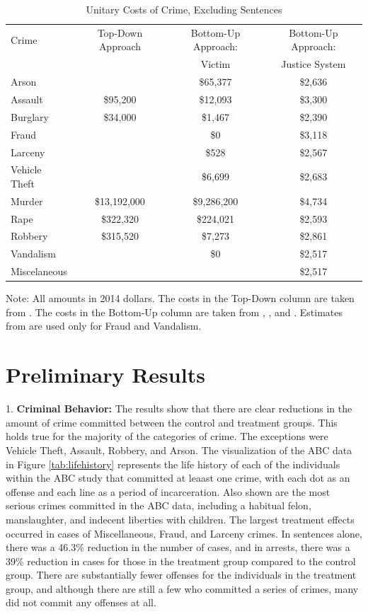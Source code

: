 \documentclass[11pt]{amsart}
\begin{document}
\begin{table}[H] \caption{Unitary Costs of Crime, Excluding Sentences} \label{tab:individual-crime-cost}
\begin{tabular}{lccc}
Crime			&Top-Down Approach	&Bottom-Up Approach:&Bottom-Up Approach:\\ 
				&					&Victim				&Justice System \\ \hline \hline
Arson			&					&\$65,377			&\$2,636\\
Assault			&\$95,200			&\$12,093 			&\$3,300\\
Burglary		&\$34,000			&\$1,467 			&\$2,390\\		
Fraud			&					&\$0				&\$3,118\\
Larceny			&					&\$528 				&\$2,567\\
Vehicle Theft	&					&\$6,699 			&\$2,683\\
Murder			&\$13,192,000		&\$9,286,200 		&\$4,734\\
Rape			&\$322,320			&\$224,021 			&\$2,593\\
Robbery			&\$315,520			&\$7,273 			&\$2,861\\
Vandalism		&					&\$0				&\$2,517\\
Miscelaneous	&					&					&\$2,517\\
\end{tabular}

\footnotesize{Note: All amounts in 2014 dollars. The costs in the Top-Down column are taken from \cite{cohen2004willingness}. The costs in the Bottom-Up column are taken from \cite{cohen1994costs}, \cite{miller1996victim}, and \cite{mccollister2010cost}. Estimates from \cite{mccollister2010cost} are used only for Fraud and Vandalism.}
\end{table}

\section{Preliminary Results}

1. \textbf{Criminal Behavior:} The results show that there are clear reductions in the amount of crime committed between the control and treatment groups. This holds true for the majority of the categories of crime. The exceptions were Vehicle Theft, Assault, Robbery, and Arson. The visualization of the ABC data in Figure \ref{tab:lifehistory} represents the life history of each of the individuals within the ABC study that committed at leaast one crime, with each dot as an offense and each line as a period of incarceration. Also shown are the most serious crimes committed in the ABC data, including a habitual felon, manslaughter, and indecent liberties with children. The largest treatment effects occurred in cases of Miscellaneous, Fraud, and Larceny crimes. In sentences alone, there was a 46.3\% reduction in the number of cases, and in arrests, there was a 39\% reduction in cases for those in the treatment group compared to the control group. There are substantially fewer offenses for the individuals in the treatment group, and although there are still a few who committed a series of crimes, many did not commit any offenses at all.
\end{document}
